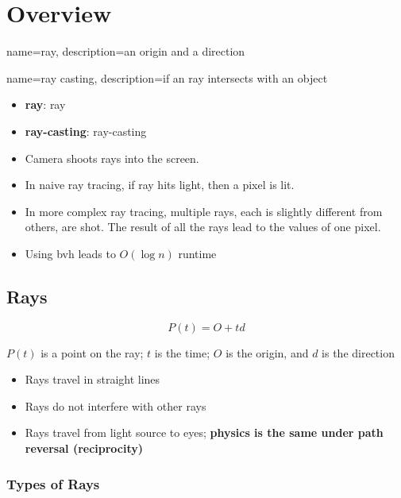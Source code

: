 \chapter{Overview}

{
  name=ray,
  description={an origin and a direction}
}

{
  name=ray casting,
  description={if an ray intersects with an object}
}


\begin{itemize}
  \item \textbf{\Gls{ray}}: \Glsdesc{ray}
  \item \textbf{\Gls{ray-casting}}: \Glsdesc{ray-casting}
  \item Camera shoots rays into the screen.
  \item In naive ray tracing, if ray hits light, then a pixel is lit.
  \item In more complex ray tracing, multiple rays, each is slightly different
  from others, are shot. The result of all the rays lead to the values of one
  pixel.
  \item Using \acrfull{bvh} leads to $ O\left( \log n \right) $ runtime
\end{itemize}

\section{Rays}

  \begin{equation}
    P\left( t \right) = O + td
  \end{equation}

  $ P\left( t \right) $ is a point on the ray; $ t $ is the time; $ O $ is
  the origin, and $ d $ is the direction

  \begin{itemize}
    \item Rays travel in straight lines
    \item Rays do not interfere with other rays
    \item Rays travel from light source to eyes; \textbf{physics is the same under
    path reversal (reciprocity)}
  \end{itemize}

  \subsection{Types of Rays}

